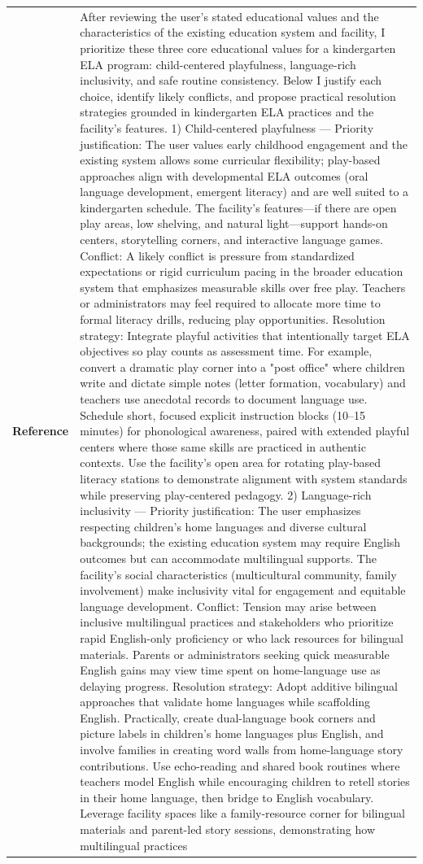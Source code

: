 \begin{longtable}{@{}l p{13cm}@{}}
  \textbf{Reference} & After reviewing the user's stated educational values and the characteristics of the existing education system and facility, I prioritize these three core educational values for a kindergarten ELA program: child-centered playfulness, language-rich inclusivity, and safe routine consistency. Below I justify each choice, identify likely conflicts, and propose practical resolution strategies grounded in kindergarten ELA practices and the facility's features. 1) Child-centered playfulness --- Priority justification: The user values early childhood engagement and the existing system allows some curricular flexibility; play-based approaches align with developmental ELA outcomes (oral language development, emergent literacy) and are well suited to a kindergarten schedule. The facility's features---if there are open play areas, low shelving, and natural light---support hands-on centers, storytelling corners, and interactive language games. Conflict: A likely conflict is pressure from standardized expectations or rigid curriculum pacing in the broader education system that emphasizes measurable skills over free play. Teachers or administrators may feel required to allocate more time to formal literacy drills, reducing play opportunities. Resolution strategy: Integrate playful activities that intentionally target ELA objectives so play counts as assessment time. For example, convert a dramatic play corner into a "post office" where children write and dictate simple notes (letter formation, vocabulary) and teachers use anecdotal records to document language use. Schedule short, focused explicit instruction blocks (10--15 minutes) for phonological awareness, paired with extended playful centers where those same skills are practiced in authentic contexts. Use the facility's open area for rotating play-based literacy stations to demonstrate alignment with system standards while preserving play-centered pedagogy. 2) Language-rich inclusivity --- Priority justification: The user emphasizes respecting children's home languages and diverse cultural backgrounds; the existing education system may require English outcomes but can accommodate multilingual supports. The facility's social characteristics (multicultural community, family involvement) make inclusivity vital for engagement and equitable language development. Conflict: Tension may arise between inclusive multilingual practices and stakeholders who prioritize rapid English-only proficiency or who lack resources for bilingual materials. Parents or administrators seeking quick measurable English gains may view time spent on home-language use as delaying progress. Resolution strategy: Adopt additive bilingual approaches that validate home languages while scaffolding English. Practically, create dual-language book corners and picture labels in children's home languages plus English, and involve families in creating word walls from home-language story contributions. Use echo-reading and shared book routines where teachers model English while encouraging children to retell stories in their home language, then bridge to English vocabulary. Leverage facility spaces like a family-resource corner for bilingual materials and parent-led story sessions, demonstrating how multilingual practices 
\end{longtable}
